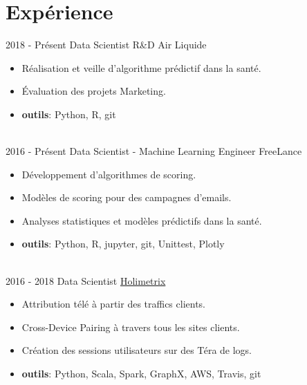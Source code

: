 \documentclass[letterpaper]{twentysecondcvfr} %
\begin{document}
\makeprofile %



\section{Exp\'erience}{\faAlignJustify}

\begin{twenty} %
	\twentyitem
    	{2018 -}
	{Pr\'esent}
         {Data Scientist R\&D}
         {Air Liquide}
        {}
        {
				\begin{itemize}
				\item R\'ealisation et veille d'algorithme pr\'edictif dans la sant\'e.
				\item \'Evaluation des projets Marketing.
				\item \textbf{outils}: Python, R,  git
				\end{itemize} }\\

	\twentyitem
    	{2016 -}
		{Pr\'esent}
        {Data Scientist - Machine Learning Engineer}
        {FreeLance}
        {}
        {\begin{itemize}
        \item D\'eveloppement d'algorithmes de scoring.
        \item Mod\`eles de scoring pour des campagnes d'emails. 
        \item Analyses statistiques et mod\`eles pr\'edictifs dans la sant\'e. 
				\item \textbf{outils}: Python, R, jupyter, git, Unittest, Plotly
    \end{itemize}}\\
		
\twentyitem
    	{2016 -}
		{2018}
        {Data Scientist}
        {\href{http://www.holimetrix.ccom/}{Holimetrix}}
        {}
        {
				\begin{itemize}
				\item Attribution t\'el\'e \`a partir des traffics clients. 
				\item Cross-Device Pairing \`a travers tous les sites clients.
				\item Cr\'eation des sessions utilisateurs sur des T\'era de logs.
				\item \textbf{outils}: Python, Scala, Spark, GraphX, AWS, Travis, git
				\end{itemize}} \\


\end{twenty}
\end{document}
